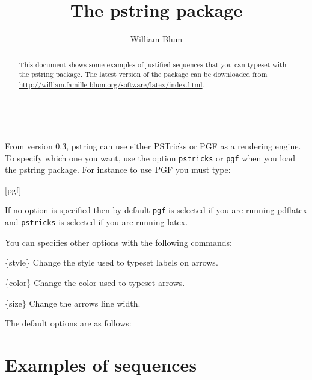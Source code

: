 
%


\author{William Blum}
\title{The pstring package}

\maketitle
\begin{abstract}
This document shows some examples of justified sequences that you
can typeset with the pstring package.
The latest version of the package can be downloaded from \url{http://william.famille-blum.org/software/latex/index.html}.

\begin{codeexample}[width=5cm]
.
\end{codeexample}

\end{abstract}

From version 0.3, pstring can use either PSTricks or PGF as a rendering engine. To specify which one
you want, use the option \verb|pstricks| or \verb|pgf| when you load the pstring package. For instance to use PGF you must type:
\begin{codeexample}
\usepackage{pstring}[pgf]
\end{codeexample}
If no option is specified then by default \verb|pgf| is selected if you are running pdflatex
and \verb|pstricks| is selected if you are running latex.

You can specifies other options with the following commands:
\begin{command}{\pstrSetLabelStyle\{style\}}
Change the style used to typeset labels on arrows.
\end{command}
\begin{command}{\pstrSetArrowColor\{color\}}
Change the color used to typeset arrows.
\end{command}
\begin{command}{\pstrSetArrowLineWidth\{size\}}
Change the arrows line width.
\end{command}
The default options are as follows:
\begin{codeexample}
\pstrSetLabelStyle{\color{blue} \tiny}
\pstrSetArrowLineWidth{0.3pt}
\end{codeexample}

\section{Examples of sequences}

